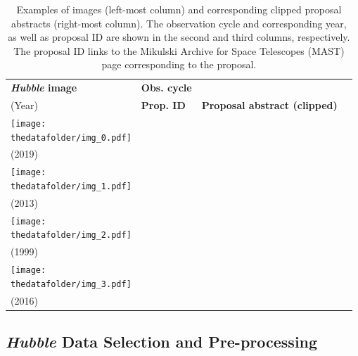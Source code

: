 \documentclass[10pt]{article} %
\newcommand{\hubble}{\emph{Hubble}\xspace}
\begin{document}
\begin{table}[h!]
  \centering
  \begin{tabular}{m{} p{1.9cm} p{1.9cm} m{8cm}}
      \toprule
      \centering \bfseries \hubble image & \centering \bfseries Obs. cycle \\ (Year) & \centering \bfseries Prop. ID & \centering \bfseries Proposal abstract (clipped) \tabularnewline
      \midrule
      \centering \texttt{[image: \\thedatafolder/img\_0.pdf]} & \centering  \\ (2019) & \centering  &  {\scriptsize } \tabularnewline
      \midrule
      \centering \texttt{[image: \\thedatafolder/img\_1.pdf]} & \centering  \\ (2013) & \centering  &  {\scriptsize } \tabularnewline
      \midrule
      \centering \texttt{[image: \\thedatafolder/img\_2.pdf]} & \centering  \\ (1999) & \centering  &  {\scriptsize } \tabularnewline
      \midrule
      \centering \texttt{[image: \\thedatafolder/img\_3.pdf]} & \centering  \\ (2016) & \centering  &  {\scriptsize } \tabularnewline
      \bottomrule
  \end{tabular}
  \caption{Examples of images (left-most column) and corresponding clipped proposal abstracts (right-most column). The observation cycle and corresponding year, as well as proposal ID are shown in the second and third columns, respectively. The proposal ID links to the Mikulski Archive for Space Telescopes (MAST) page corresponding to the proposal.}
  \label{tab:dataset}
\end{table}


\subsection{\hubble Data Selection and Pre-processing}
\end{document}

